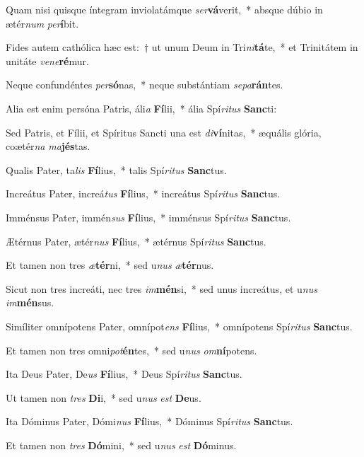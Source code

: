 \item Quam nisi quisque íntegram inviolatámque \textit{ser}\textbf{vá}verit,~* absque dúbio in ætér\textit{num} \textit{per}\textbf{í}bit.
\item Fides autem cathólica hæc est:~† ut unum Deum in Tri\textit{ni}\textbf{tá}te,~* et Trinitátem in unitáte \textit{ve}\textit{ne}\textbf{ré}mur.
\item Neque confundéntes \textit{per}\textbf{só}nas,~* neque substántiam \textit{se}\textit{pa}\textbf{rán}tes.
\item Alia est enim persóna Patris, áli\textit{a} \textbf{Fí}lii,~* ália Spí\textit{ri}\textit{tus} \textbf{Sanc}ti:
\item Sed Patris, et Fílii, et Spíritus Sancti una est \textit{di}\textbf{ví}nitas,~* æquális glória, coætér\textit{na} \textit{ma}\textbf{jés}tas.
\item Qualis Pater, ta\textit{lis} \textbf{Fí}lius,~* talis Spí\textit{ri}\textit{tus} \textbf{Sanc}tus.
\item Increátus Pater, increá\textit{tus} \textbf{Fí}lius,~* increátus Spí\textit{ri}\textit{tus} \textbf{Sanc}tus.
\item Imménsus Pater, immén\textit{sus} \textbf{Fí}lius,~* imménsus Spí\textit{ri}\textit{tus} \textbf{Sanc}tus.
\item Ætérnus Pater, ætér\textit{nus} \textbf{Fí}lius,~* ætérnus Spí\textit{ri}\textit{tus} \textbf{Sanc}tus.
\item Et tamen non tres \textit{æ}\textbf{tér}ni,~* sed u\textit{nus} \textit{æ}\textbf{tér}nus.
\item Sicut non tres increáti, nec tres \textit{im}\textbf{mén}si,~* sed unus increátus, et u\textit{nus} \textit{im}\textbf{mén}sus.
\item Simíliter omnípotens Pater, omnípot\textit{ens} \textbf{Fí}lius,~* omnípotens Spí\textit{ri}\textit{tus} \textbf{Sanc}tus.
\item Et tamen non tres omni\textit{pot}\textbf{én}tes,~* sed u\textit{nus} \textit{om}\textbf{ní}potens.
\item Ita Deus Pater, De\textit{us} \textbf{Fí}lius,~* Deus Spí\textit{ri}\textit{tus} \textbf{Sanc}tus.
\item Ut tamen non \textit{tres} \textbf{Di}i,~* sed u\textit{nus} \textit{est} \textbf{De}us.
\item Ita Dóminus Pater, Dómi\textit{nus} \textbf{Fí}lius,~* Dóminus Spí\textit{ri}\textit{tus} \textbf{Sanc}tus.
\item Et tamen non \textit{tres} \textbf{Dó}mini,~* sed u\textit{nus} \textit{est} \textbf{Dó}minus.
